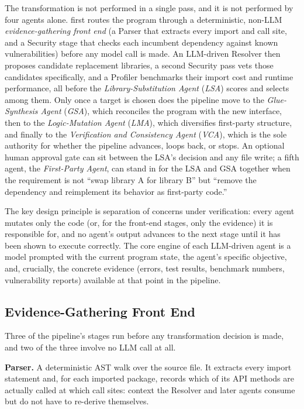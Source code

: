 The transformation is not performed in a single pass, and it is not performed by four agents alone. \sys first routes the program through a deterministic, non-LLM \emph{evidence-gathering front end} (a Parser that extracts every import and call site, and a Security stage that checks each incumbent dependency against known vulnerabilities) before any model call is made. An LLM-driven Resolver then proposes candidate replacement libraries, a second Security pass vets those candidates specifically, and a Profiler benchmarks their import cost and runtime performance, all before the \emph{Library-Substitution Agent} (\emph{LSA}) scores and selects among them. Only once a target is chosen does the pipeline move to the \emph{Glue-Synthesis Agent} (\emph{GSA}), which reconciles the program with the new interface, then to the \emph{Logic-Mutation Agent} (\emph{LMA}), which diversifies first-party structure, and finally to the \emph{Verification and Consistency Agent} (\emph{VCA}), which is the sole authority for whether the pipeline advances, loops back, or stops. An optional human approval gate can sit between the LSA's decision and any file write; a fifth agent, the \emph{First-Party Agent}, can stand in for the LSA and GSA together when the requirement is not ``swap library A for library B'' but ``remove the dependency and reimplement its behavior as first-party code.''

The key design principle is separation of concerns under verification: every agent mutates only the code (or, for the front-end stages, only the evidence) it is responsible for, and no agent's output advances to the next stage until it has been shown to execute correctly. The core engine of each LLM-driven agent is a model prompted with the current program state, the agent's specific objective, and, crucially, the concrete evidence (errors, test results, benchmark numbers, vulnerability reports) available at that point in the pipeline.

\subsection{Evidence-Gathering Front End}
\label{sec:frontend}

Three of the pipeline's stages run before any transformation decision is made, and two of the three involve no LLM call at all.

\textbf{Parser.} A deterministic AST walk over the source file. It extracts every import statement and, for each imported package, records which of its API methods are actually called at which call sites: context the Resolver and later agents consume but do not have to re-derive themselves.

